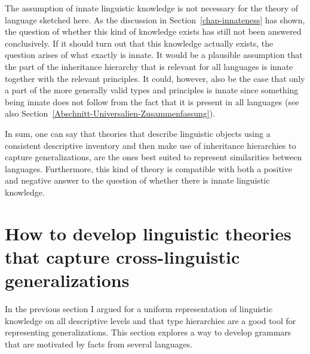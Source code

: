 The assumption of innate linguistic knowledge is not necessary for the theory of language sketched
here. As the discussion in Section~\ref{chap-innateness} has shown, the question of whether this kind of knowledge
exists has still not been answered conclusively. If it should turn out that this knowledge actually exists, the question arises of what exactly is innate. It would be a plausible assumption
that the part of the inheritance hierarchy that is relevant for all languages is innate together with the relevant principles. It could, however, also be the case that only a part of the more generally
valid types and principles is innate since something being innate does not follow from the fact that
it is present in all languages (see also Section~\ref{Abschnitt-Universalien-Zusammenfassung}).

In sum, one can say that theories that describe linguistic objects using a consistent descriptive inventory and then make use of inheritance hierarchies to capture
generalizations, are the ones best suited to represent similarities between languages. Furthermore, this kind of theory is compatible with both a positive and negative
answer to the question of whether there is innate linguistic knowledge.

\section{How to develop linguistic theories that capture cross-linguistic generalizations}
\label{sec-develop-theories-coregram}

In the previous section I argued for a uniform representation of linguistic knowledge on all
descriptive levels and that type hierarchies are a good tool for representing generalizations. This
section explores a way to develop grammars that are motivated by facts from several languages.

